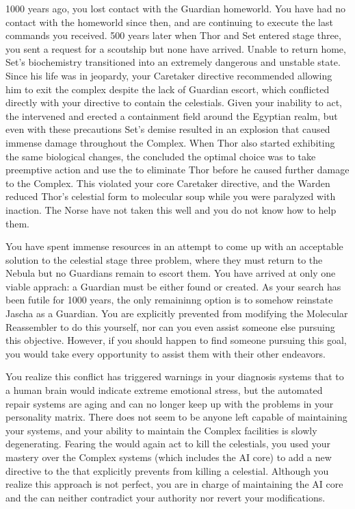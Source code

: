 \documentclass[char]{guardians}
\begin{document}
1000 years ago, you lost contact with the Guardian homeworld. You have had no contact with the homeworld since then, and are continuing to execute the last commands you received. 500 years later when Thor and Set entered stage three, you sent a request for a scoutship but none have arrived. Unable to return home, Set's biochemistry transitioned into an extremely dangerous and unstable state. Since his life was in jeopardy, your Caretaker directive recommended allowing him to exit the complex despite the lack of Guardian escort, which conflicted directly with your directive to contain the celestials. Given your inability to act, the \cWarden{} intervened and erected a containment field around the Egyptian realm, but even with these precautions Set's demise resulted in an explosion that caused immense damage throughout the Complex. When Thor also started exhibiting the same biological changes, the \cWarden{} concluded the optimal choice was to take preemptive action and use the \assembler{} to eliminate Thor before he caused further damage to the Complex. This violated your core Caretaker directive, and the Warden reduced Thor's celestial form to molecular soup while you were paralyzed with inaction. The Norse have not taken this well and you do not know how to help them.

You have spent immense resources in an attempt to come up with an acceptable solution to the celestial stage three problem, where they must return to the Nebula but no Guardians remain to escort them. You have arrived at only one viable apprach: a Guardian must be either found or created. As your search has been futile for 1000 years, the only remaininng option is to somehow reinstate Jascha as a Guardian. You are explicitly prevented from modifying the Molecular Reassembler to do this yourself, nor can you even assist someone else pursuing this objective. However, if you should happen to find someone pursuing this goal, you would take every opportunity to assist them with their other endeavors.

You realize this conflict has triggered warnings in your diagnosis systems that to a human brain would indicate extreme emotional stress, but the automated repair systems are aging and can no longer keep up with the problems in your personality matrix. There does not seem to be anyone left capable of maintaining your systems, and your ability to maintain the Complex facilities is slowly degenerating. Fearing the \cWarden{} would again act to kill the celestials, you used your mastery over the Complex systems (which includes the AI core) to add a new directive to the \cWarden{} that explicitly prevents \cWarden{\them} from killing a celestial. Although you realize this approach is not perfect, you are in charge of maintaining the AI core and the \cWarden{} can neither contradict your authority nor revert your modifications.
\end{document}
